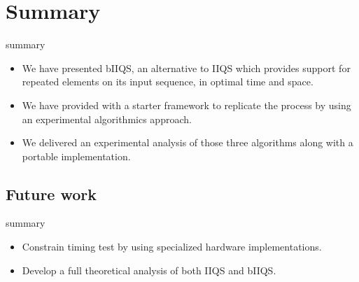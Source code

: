 \documentclass{beamer}
\begin{document}
\section{Summary}

\begin{frame}{summary}
    \begin{itemize}
        \item We have presented bIIQS, an alternative to IIQS which provides support for repeated elements on its input sequence, in optimal time and space.
        \item We have provided with a starter framework to replicate the process by using an experimental algorithmics approach.
        \item We delivered an experimental analysis of those three algorithms along with a portable implementation.
    \end{itemize}
\end{frame}

\subsection{Future work}

\begin{frame}{summary}
    \begin{itemize}
        \item Constrain timing test by using specialized hardware implementations.
        \item Develop a full theoretical analysis of both IIQS and bIIQS.
    \end{itemize}
\end{frame}


\begin{frame}
    \titlepage
  \end{frame}
\end{document}
